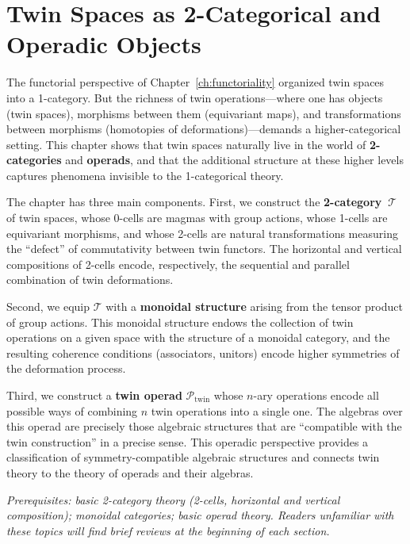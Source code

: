 \documentclass[11pt,a4paper,openany]{book}
\theoremstyle{plain}
\theoremstyle{definition}
\begin{document}
\chapter{Twin Spaces as 2-Categorical and Operadic Objects}
\label{ch:2cat}

The functorial perspective of Chapter~\ref{ch:functoriality} organized twin spaces into a 1-category. But the richness of twin operations---where one has objects (twin spaces), morphisms between them (equivariant maps), and transformations between morphisms (homotopies of deformations)---demands a higher-categorical setting. This chapter shows that twin spaces naturally live in the world of \textbf{2-categories} and \textbf{operads}, and that the additional structure at these higher levels captures phenomena invisible to the 1-categorical theory.

The chapter has three main components. First, we construct the \textbf{2-category~$\mathcal{T}$} of twin spaces, whose 0-cells are magmas with group actions, whose 1-cells are equivariant morphisms, and whose 2-cells are natural transformations measuring the ``defect'' of commutativity between twin functors. The horizontal and vertical compositions of 2-cells encode, respectively, the sequential and parallel combination of twin deformations.

Second, we equip $\mathcal{T}$ with a \textbf{monoidal structure} arising from the tensor product of group actions. This monoidal structure endows the collection of twin operations on a given space with the structure of a monoidal category, and the resulting coherence conditions (associators, unitors) encode higher symmetries of the deformation process.

Third, we construct a \textbf{twin operad} $\mathcal{P}_{\mathrm{twin}}$ whose $n$-ary operations encode all possible ways of combining $n$ twin operations into a single one. The algebras over this operad are precisely those algebraic structures that are ``compatible with the twin construction'' in a precise sense. This operadic perspective provides a classification of symmetry-compatible algebraic structures and connects twin theory to the theory of operads and their algebras.

\textit{Prerequisites: basic 2-category theory (2-cells, horizontal and vertical composition); monoidal categories; basic operad theory. Readers unfamiliar with these topics will find brief reviews at the beginning of each section.}
\end{document}
